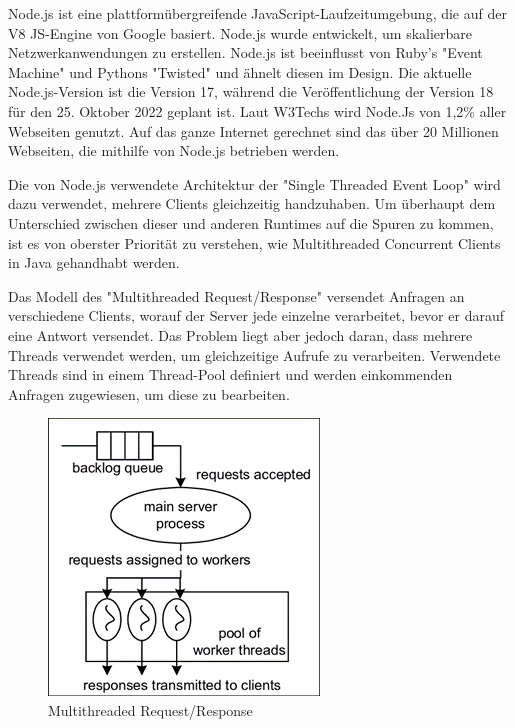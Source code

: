 \label{sec:nodejs}
Node.js ist eine plattformübergreifende JavaScript-Laufzeitumgebung, die auf der V8 JS-Engine von Google basiert. Node.js wurde entwickelt, um skalierbare Netzwerkanwendungen zu erstellen. Node.js ist beeinflusst von Ruby's "Event Machine" und Pythons "Twisted" und ähnelt diesen im Design. Die aktuelle Node.js-Version ist die Version 17, während die Veröffentlichung der Version 18 für den 25. Oktober 2022 geplant ist. Laut W3Techs wird Node.Js von 1,2\% aller Webseiten genutzt. Auf das ganze Internet gerechnet sind das über 20 Millionen Webseiten, die mithilfe von Node.js betrieben werden. \cite{Node}

Die von Node.js verwendete Architektur der "Single Threaded Event Loop" wird dazu verwendet, mehrere Clients gleichzeitig handzuhaben. Um überhaupt dem Unterschied zwischen dieser und anderen Runtimes auf die Spuren zu kommen, ist es von oberster Priorität zu verstehen, wie Multithreaded Concurrent Clients in Java gehandhabt werden. \cite{NodeJs.dev}


Das Modell des "Multithreaded Request/Response" versendet Anfragen an verschiedene Clients, worauf der Server jede einzelne verarbeitet, bevor er darauf eine Antwort versendet. Das Problem liegt aber jedoch daran, dass mehrere Threads verwendet werden, um gleichzeitige Aufrufe zu verarbeiten. Verwendete Threads sind in einem Thread-Pool definiert und werden einkommenden Anfragen zugewiesen, um diese zu bearbeiten. \cite{Arocom}



\begin{figure}[H]
    \centering
    \includegraphics{media/NodeJs/MultiThreadedRequestResponse.png}
    \caption{Multithreaded Request/Response\cite{Multithreaded}}
\end{figure}

